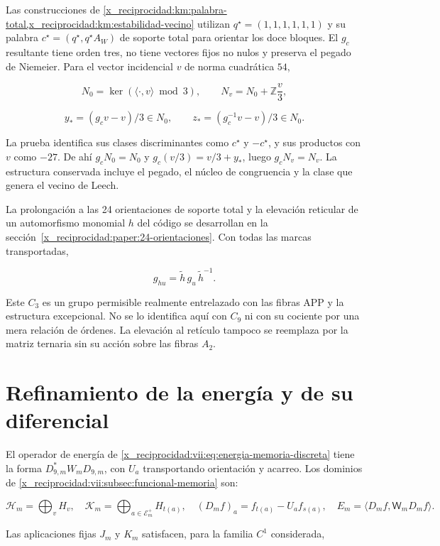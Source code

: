Las construcciones de \cref{x_reciprocidad:km:palabra-total,x_reciprocidad:km:estabilidad-vecino} utilizan \(q^\star=(1,1,1,1,1,1)\) y su palabra \(c^\star=(q^\star,q^\star A_W)\) de soporte total para orientar los doce bloques. El \(g_c\) resultante tiene orden tres, no tiene vectores fijos no nulos y preserva el pegado de Niemeier. Para el vector incidencial \(v\) de norma cuadrática \(54\),

\[
N_0=\ker(\langle\cdot,v\rangle\bmod3),\qquad
N_v=N_0+\mathbb Z\frac v3,
\]

\[
y_*=(g_cv-v)/3\in N_0,\qquad
z_*=(g_c^{-1}v-v)/3\in N_0.
\]

La prueba identifica sus clases discriminantes como \(c^\star\) y \(-c^\star\), y sus productos con \(v\) como \(-27\). De ahí \(g_cN_0=N_0\) y \(g_c(v/3)=v/3+y_*\), luego \(g_cN_v=N_v\). La estructura conservada incluye el pegado, el núcleo de congruencia y la clase que genera el vecino de Leech.

La prolongación a las 24 orientaciones de soporte total y la elevación reticular de un automorfismo monomial \(h\) del código se desarrollan en la sección~\ref{x_reciprocidad:paper:24-orientaciones}. Con todas las marcas transportadas,

\[
g_{hu}=\widetilde h\,g_u\,\widetilde h^{-1}.
\]

Este \(C_3\) es un grupo permisible realmente entrelazado con las fibras APP y la estructura excepcional. No se lo identifica aquí con \(C_9\) ni con su cociente por una mera relación de órdenes. La elevación al retículo tampoco se reemplaza por la matriz ternaria sin su acción sobre las fibras \(A_2\).

\section{Refinamiento de la energía y de su diferencial}
\label{x_reciprocidad:paper:refinamiento-energia}

El operador de energía de \eqref{x_reciprocidad:vii:eq:energia-memoria-discreta} tiene la forma \(D_{9,m}^*W_mD_{9,m}\), con \(U_a\) transportando orientación y acarreo. Los dominios de \cref{x_reciprocidad:vii:subsec:funcional-memoria} son:

\[
\mathcal H_m=\bigoplus_vH_v,\quad
\mathcal K_m=\bigoplus_{a\in\mathcal E_m^+}H_{t(a)},\quad
(D_mf)_a=f_{t(a)}-U_af_{s(a)},\quad
E_m=\langle D_mf,\mathsf W_mD_mf\rangle.
\]

Las aplicaciones fijas \(J_m\) y \(K_m\) satisfacen, para la familia \(C^1\) considerada,

